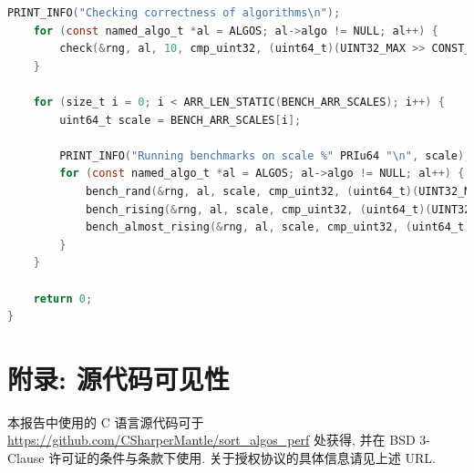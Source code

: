 \documentclass[12pt]{article}
\begin{document}
\begin{lstlisting}[language=C]
    PRINT_INFO("Checking correctness of algorithms\n");
    for (const named_algo_t *al = ALGOS; al->algo != NULL; al++) {
        check(&rng, al, 10, cmp_uint32, (uint64_t)(UINT32_MAX >> CONST_CHECK_SHIFT_DIST), gen_rand_data);
    }

    for (size_t i = 0; i < ARR_LEN_STATIC(BENCH_ARR_SCALES); i++) {
        uint64_t scale = BENCH_ARR_SCALES[i];

        PRINT_INFO("Running benchmarks on scale %" PRIu64 "\n", scale);
        for (const named_algo_t *al = ALGOS; al->algo != NULL; al++) {
            bench_rand(&rng, al, scale, cmp_uint32, (uint64_t)(UINT32_MAX >> CONST_BENCH_SHIFT_DIST));
            bench_rising(&rng, al, scale, cmp_uint32, (uint64_t)(UINT32_MAX >> CONST_BENCH_SHIFT_DIST));
            bench_almost_rising(&rng, al, scale, cmp_uint32, (uint64_t)(UINT32_MAX >> CONST_BENCH_SHIFT_DIST));
        }
    }

    return 0;
}
\end{lstlisting}

\section{附录: 源代码可见性}

本报告中使用的 C 语言源代码可于 \url{https://github.com/CSharperMantle/sort_algos_perf} 处获得, 并在 BSD 3-Clause 许可证的条件与条款下使用. 关于授权协议的具体信息请见上述 URL.
\end{document}
